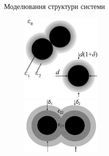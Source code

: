 \documentclass[10pt]{beamer}
\begin{document}
\begin{frame}{Моделювання структури системи}

\begin{figure}
\vspace{-25pt}
  \begin{center}
    \includegraphics[width=0.35\textwidth]{images/particles-pen.eps}\\
    \includegraphics[width=0.35\textwidth]{images/2shell.png}
  \end{center}
\vspace{-55pt}
\end{figure}



\end{frame}
\end{document}
